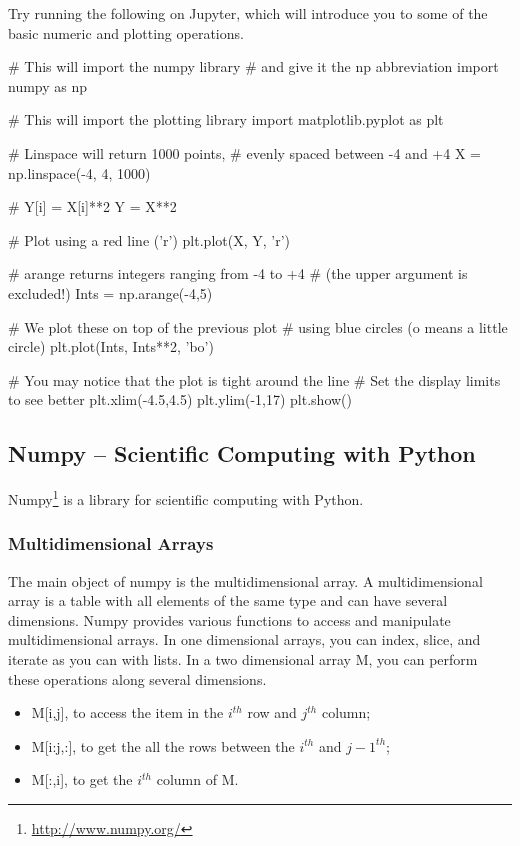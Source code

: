 \begin{exercise}
Try running the following on Jupyter, which will introduce you to some of the basic numeric and plotting operations.

\begin{python}
# This will import the numpy library
# and give it the np abbreviation
import numpy as np

# This will import the plotting library
import matplotlib.pyplot as plt

# Linspace will return 1000 points,
# evenly spaced between -4 and +4
X = np.linspace(-4, 4, 1000)

# Y[i] = X[i]**2
Y = X**2

# Plot using a red line ('r')
plt.plot(X, Y, 'r')

# arange returns integers ranging from -4 to +4
# (the upper argument is excluded!)
Ints = np.arange(-4,5)

# We plot these on top of the previous plot
# using blue circles (o means a little circle)
plt.plot(Ints, Ints**2, 'bo')

# You may notice that the plot is tight around the line
# Set the display limits to see better
plt.xlim(-4.5,4.5)
plt.ylim(-1,17)
plt.show()
\end{python}
\end{exercise}

\subsection{Numpy -- Scientific Computing with Python}

Numpy\footnote{\url{http://www.numpy.org/}} is a library for scientific computing with Python.

\subsubsection{Multidimensional Arrays}

The main object of numpy is the multidimensional array. A multidimensional array is a table with all elements of the same type and can have several dimensions. Numpy provides various functions to access and manipulate multidimensional arrays. In one dimensional arrays, you can index, slice, and iterate as you can with lists. In a two dimensional array M, you can perform these operations along several dimensions.

\begin{itemize}
 \item M[i,j], to access the item in the $i^{th}$ row and $j^{th}$ column; 
 \item M[i:j,:], to get the all the rows between the $i^{th}$ and $j-1^{th}$;
 \item M[:,i], to get the $i^{th}$ column of M.
\end{itemize}

